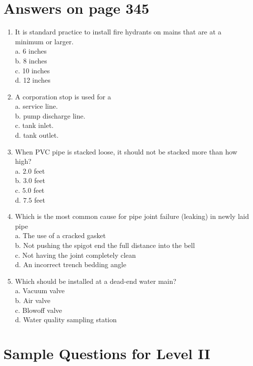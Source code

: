 \documentclass[10pt]{article}
\begin{document}
\section{Answers on page 345}
\begin{enumerate}
  \item It is standard practice to install fire hydrants on mains that are at a minimum or larger.\\
a. 6 inches\\
b. 8 inches\\
c. 10 inches\\
d. 12 inches

  \item A corporation stop is used for a\\
a. service line.\\
b. pump discharge line.\\
c. tank inlet.\\
d. tank outlet.

  \item When PVC pipe is stacked loose, it should not be stacked more than how high?\\
a. $2.0$ feet\\
b. $3.0$ feet\\
c. $5.0$ feet\\
d. $7.5$ feet

  \item Which is the most common cause for pipe joint failure (leaking) in newly laid pipe\\
a. The use of a cracked gasket\\
b. Not pushing the spigot end the full distance into the bell\\
c. Not having the joint completely clean\\
d. An incorrect trench bedding angle

  \item Which should be installed at a dead-end water main?\\
a. Vacuum valve\\
b. Air valve\\
c. Blowoff valve\\
d. Water quality sampling station

\end{enumerate}

\section{Sample Questions for Level II}
\end{document}
